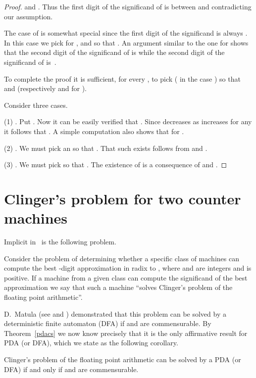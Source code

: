 \documentclass[12pt]{article}
\begin{document}
\begin{proof}
and
. Thus
the first digit of the significand of
 is between  and 
contradicting our assumption.

The case of  is somewhat special since the first digit of the
significand is always . In this case we pick
 for ,  and 
so that . An argument
similar to the one for  shows that the second digit of the
significand of  is  while the
second digit of the significand of 
is~.

To complete the proof it is sufficient, for every , to pick
 ( in the case ) so that 
 and 
(respectively  and
 for ).

Consider three cases.

(1) . Put . Now it can be easily
verified that . Since  decreases as
 increases for any  it follows that
. A simple computation also shows that 
 for .

(2) . We must pick an  so that 
. That such  exists
follows from  and .

(3) . We must pick  so that
. The existence of
 is a consequence of  and
.
\end{proof}

\section{Clinger's problem for two counter machines}

Implicit in~\cite{Clinger} is the following problem.
\begin{definition}
Consider the problem of determining whether a
specific class of machines can compute the best -digit
approximation in radix  to ,
where  and  are integers and  is positive. If a machine from a given class can
compute the significand of the best approximation we say that such a machine
``solves Clinger's problem of the floating point arithmetic''.
\end{definition}

D.~Matula (see \cite{Matulainout} and \cite{Clinger})
demonstrated that this problem can be solved by a deterministic finite
automaton (DFA) if  and  are commensurable.
By Theorem~\ref{pdacs} we now know precisely that it is the only affirmative result
for PDA (or DFA), which we state as the following corollary.
\begin{corollary}
Clinger's problem of the floating point arithmetic can be solved by a PDA
(or DFA) if and only if  and  are commensurable.
\end{corollary}
\end{document}
